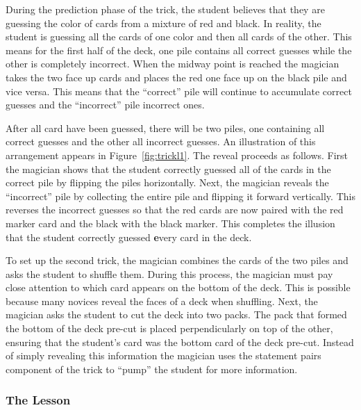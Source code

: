 During the prediction phase of the trick, the student believes that they are
guessing the color of cards from a mixture of red and black.
In reality,
the student is guessing all the cards of one color and then all cards of
the other.
This means for the first half of the deck, one pile contains all correct
guesses while the other is completely incorrect.
When the midway point is reached the magician takes the two face up cards and places the
red one face up on the black pile and vice versa.
This means that the ``correct'' pile will continue to accumulate correct
guesses and the ``incorrect'' pile incorrect ones.

After all card have been guessed, there will be two piles,
one containing all correct guesses and the other
all incorrect guesses.
An illustration of this arrangement appears in Figure~\ref{fig:trickl1}.
The reveal proceeds as follows.
First the magician shows that the student correctly guessed all of the cards
in the correct pile by flipping the piles horizontally.
Next, the magician reveals the ``incorrect'' pile by collecting the
entire pile and flipping it forward vertically.  This
reverses the incorrect guesses so that the red cards are now paired
with the red marker card and the black with the black marker.  This completes
the illusion that the student correctly guessed {\textbf every} card in the
deck.

To set up the second trick, the magician combines the cards of the two piles and asks the
student to shuffle them.  During this process, the magician must pay close
attention to which card appears on the bottom of the deck.  This is possible
because many novices reveal the faces of a deck when shuffling.  Next,
the magician asks the student to cut the deck into two packs.  The pack that
formed the bottom of the deck pre-cut is placed perpendicularly on
top of the other, ensuring that the student's card was the bottom card of
the deck pre-cut. Instead of simply revealing this information the
magician uses the statement pairs component of the trick to ``pump'' the student
for more information.

%

\subsubsection{The Lesson}

